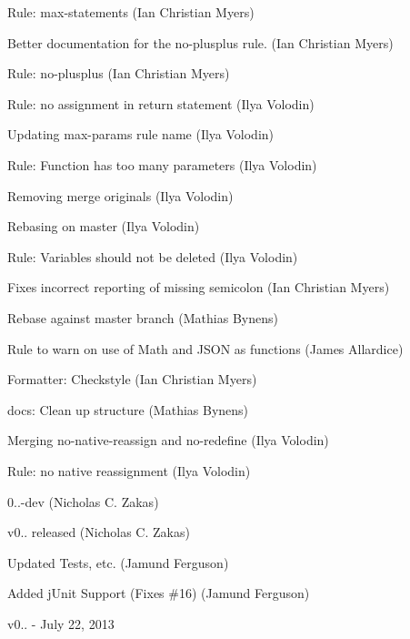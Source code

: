 \begin{DoxyItemize}
\item Rule\+: max-\/statements (Ian Christian Myers)
\item Better documentation for the {\ttfamily no-\/plusplus} rule. (Ian Christian Myers)
\item Rule\+: no-\/plusplus (Ian Christian Myers)
\item Rule\+: no assignment in return statement (Ilya Volodin)
\item Updating max-\/params rule name (Ilya Volodin)
\item Rule\+: Function has too many parameters (Ilya Volodin)
\item Removing merge originals (Ilya Volodin)
\item Rebasing on master (Ilya Volodin)
\item Rule\+: Variables should not be deleted (Ilya Volodin)
\item Fixes incorrect reporting of missing semicolon (Ian Christian Myers)
\item Rebase against master branch (Mathias Bynens)
\item Rule to warn on use of Math and J\+S\+ON as functions (James Allardice)
\item Formatter\+: Checkstyle (Ian Christian Myers)
\item docs\+: Clean up structure (Mathias Bynens)
\item Merging no-\/native-\/reassign and no-\/redefine (Ilya Volodin)
\item Rule\+: no native reassignment (Ilya Volodin)
\item 0..-\/dev (Nicholas C. Zakas)
\item v0.. released (Nicholas C. Zakas)
\item Updated Tests, etc. (Jamund Ferguson)
\item Added j\+Unit Support (Fixes \#16) (Jamund Ferguson)
\end{DoxyItemize}

v0.. -\/ July 22, 2013


